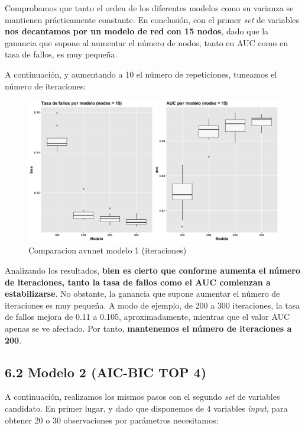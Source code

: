 \documentclass[
]{article}
\begin{document}
Comprobamos que tanto el orden de los diferentes modelos como su
varianza se mantienen prácticamente constante. En conclusión, con el
primer \emph{set} de variables \textbf{nos decantamos por un modelo de
red con 15 nodos}, dado que la ganancia que supone al aumentar el número
de nodos, tanto en AUC como en tasa de fallos, es muy pequeña.

A continuación, y aumentando a 10 el número de repeticiones, tuneamos el
número de iteraciones:

\begin{figure}[h!]

{\centering \includegraphics[width=0.99\linewidth,height=0.99\textheight,]{./charts/02_comparacion_tasa_auc_modelo1_10rep_iters} 

}

\caption{Comparacion avnnet modelo 1 (iteraciones)}\label{fig:unnamed-chunk-54}
\end{figure}

Analizando los resultados, \textbf{bien es cierto que conforme aumenta
el número de iteraciones, tanto la tasa de fallos como el AUC comienzan
a estabilizarse}. No obstante, la ganancia que supone aumentar el número
de iteraciones es muy pequeña. A modo de ejemplo, de 200 a 300
iteraciones, la tasa de fallos mejora de 0.11 a 0.105, aproximadamente,
mientras que el valor AUC apenas se ve afectado. Por tanto,
\textbf{mantenemos el número de iteraciones a 200}.

\hypertarget{modelo-2-aic-bic-top-4-1}{%
\subsection{6.2 Modelo 2 (AIC-BIC TOP
4)}\label{modelo-2-aic-bic-top-4-1}}

A continuación, realizamos los mismos pasos con el segundo \emph{set} de
variables candidato. En primer lugar, y dado que disponemos de 4
variables \emph{input}, para obtener 20 o 30 observaciones por
parámetros necesitamos:
\end{document}

